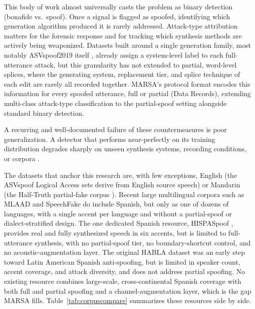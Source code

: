 \documentclass[11pt]{article}
\begin{document}
This body of work almost universally casts the problem as binary detection (bonafide vs.\ spoof). Once a signal is flagged as spoofed, identifying which generation algorithm produced it is rarely addressed. Attack-type attribution matters for the forensic response and for tracking which synthesis methods are actively being weaponized. Datasets built around a single generation family, most notably ASVspoof2019 itself \citep{asvspoof2019}, already assign a system-level label to each full-utterance attack, but this granularity has not extended to partial, word-level splices, where the generating system, replacement tier, and splice technique of each edit are rarely all recorded together. MARSA's protocol format encodes this information for every spoofed utterance, full or partial (Data Records), extending multi-class attack-type classification to the partial-spoof setting alongside standard binary detection.

A recurring and well-documented failure of these countermeasures is poor generalization. A detector that performs near-perfectly on its training distribution degrades sharply on unseen synthesis systems, recording conditions, or corpora \citep{muller2022generalize,muller2024harder}.

The datasets that anchor this research are, with few exceptions, English (the ASVspoof Logical Access sets derive from English source speech) or Mandarin (the Half-Truth partial-fake corpus \citep{yi2021had}). Recent large multilingual corpora such as MLAAD \citep{mlaad} and SpeechFake \citep{speechfake} do include Spanish, but only as one of dozens of languages, with a single accent per language and without a partial-spoof or dialect-stratified design. The one dedicated Spanish resource, HISPASpoof \citep{hispaspoof}, provides real and fully synthesized speech in six accents, but is limited to full-utterance synthesis, with no partial-spoof tier, no boundary-shortcut control, and no acoustic-augmentation layer. The original HABLA dataset \citep{habla} was an early step toward Latin American Spanish anti-spoofing, but is limited in speaker count, accent coverage, and attack diversity, and does not address partial spoofing. No existing resource combines large-scale, cross-continental Spanish coverage with both full and partial spoofing and a channel-augmentation layer, which is the gap MARSA fills. Table~\ref{tab:corpuscompare} summarizes these resources side by side.
\end{document}
